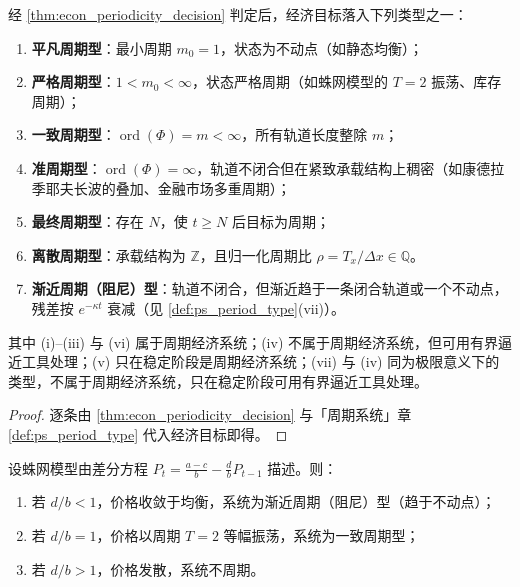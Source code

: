 \begin{corollary}[经济周期类型]\label{cor:econ_period_type}
经 \cref{thm:econ_periodicity_decision} 判定后，经济目标落入下列类型之一：
\begin{enumerate}[label=(\roman*)]
    \item \textbf{平凡周期型}：最小周期 $m_0=1$，状态为不动点（如静态均衡）；
    \item \textbf{严格周期型}：$1<m_0<\infty$，状态严格周期（如蛛网模型的 $T=2$ 振荡、库存周期）；
    \item \textbf{一致周期型}：$\operatorname{ord}(\Phi)=m<\infty$，所有轨道长度整除 $m$；
    \item \textbf{准周期型}：$\operatorname{ord}(\Phi)=\infty$，轨道不闭合但在紧致承载结构上稠密（如康德拉季耶夫长波的叠加、金融市场多重周期）；
    \item \textbf{最终周期型}：存在 $N$，使 $t\ge N$ 后目标为周期；
    \item \textbf{离散周期型}：承载结构为 $\mathbb Z$，且归一化周期比 $\rho=T_x/\Delta x\in\mathbb Q$。
    \item \textbf{渐近周期（阻尼）型}：轨道不闭合，但渐近趋于一条闭合轨道或一个不动点，残差按 $e^{-\kappa t}$ 衰减（见 \cref{def:ps_period_type}(vii)）。
\end{enumerate}
其中 (i)--(iii) 与 (vi) 属于周期经济系统；(iv) 不属于周期经济系统，但可用有界逼近工具处理；(v) 只在稳定阶段是周期经济系统；(vii) 与 (iv) 同为极限意义下的类型，不属于周期经济系统，只在稳定阶段可用有界逼近工具处理。
\end{corollary}

\begin{proof}
逐条由 \cref{thm:econ_periodicity_decision} 与「周期系统」章 \cref{def:ps_period_type} 代入经济目标即得。
\end{proof}

\begin{lemma}[蛛网模型的周期判定]\label{lem:econ_cobweb_periodic}
设蛛网模型由差分方程 $P_t = \frac{a-c}{b} - \frac{d}{b}P_{t-1}$ 描述。则：
\begin{enumerate}[label=(\roman*)]
    \item 若 $d/b<1$，价格收敛于均衡，系统为渐近周期（阻尼）型（趋于不动点）；
    \item 若 $d/b=1$，价格以周期 $T=2$ 等幅振荡，系统为一致周期型；
    \item 若 $d/b>1$，价格发散，系统不周期。
\end{enumerate}
\end{lemma}

